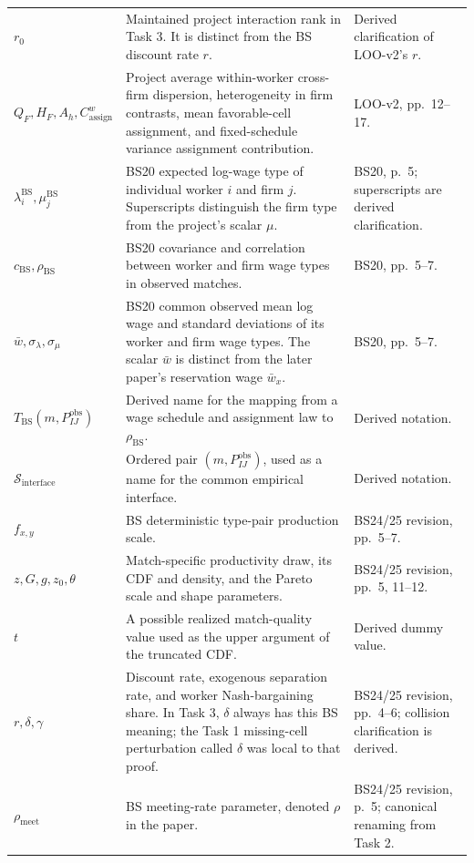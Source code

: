 \documentclass[11pt]{article}
\begin{document}
\begin{longtable}{p{}p{}p{}}
\(r_0\) & Maintained project interaction rank in Task 3.  It is distinct from
the BS discount rate \(r\). & Derived clarification of LOO-v2's \(r\). \\
\(Q_F,H_F,A_h,C^w_{\mathrm{assign}}\) & Project average within-worker
cross-firm dispersion, heterogeneity in firm contrasts, mean favorable-cell
assignment, and fixed-schedule variance assignment contribution. & LOO-v2,
pp.\ 12--17. \\
\(\lambda_i^{\mathrm{BS}},\mu_j^{\mathrm{BS}}\) & BS20 expected log-wage type
of individual worker \(i\) and firm \(j\).  Superscripts distinguish the firm
type from the project's scalar \(\mu\). & BS20, p.\ 5; superscripts are
derived clarification. \\
\(c_{\mathrm{BS}},\rho_{\mathrm{BS}}\) & BS20 covariance and correlation
between worker and firm wage types in observed matches. & BS20, pp.\ 5--7. \\
\(\bar w,\sigma_\lambda,\sigma_\mu\) & BS20 common observed mean log wage and
standard deviations of its worker and firm wage types.  The scalar
\(\bar w\) is distinct from the later paper's reservation wage
\(\bar w_x\). & BS20, pp.\ 5--7. \\
\(T_{\mathrm{BS}}(m,P^{\mathrm{obs}}_{IJ})\) & Derived name for the mapping
from a wage schedule and assignment law to \(\rho_{\mathrm{BS}}\). & Derived
notation. \\
\(\mathcal S_{\mathrm{interface}}\) & Ordered pair
\((m,P^{\mathrm{obs}}_{IJ})\), used as a name for the common empirical
interface. & Derived notation. \\
\(f_{x,y}\) & BS deterministic type-pair production scale. & BS24/25
revision, pp.\ 5--7. \\
\(z,G,g,z_0,\theta\) & Match-specific productivity draw, its CDF and density,
and the Pareto scale and shape parameters. & BS24/25 revision, pp.\ 5,
11--12. \\
\(t\) & A possible realized match-quality value used as the upper argument
of the truncated CDF. & Derived dummy value. \\
\(r,\delta,\gamma\) & Discount rate, exogenous separation rate, and worker
Nash-bargaining share.  In Task 3, \(\delta\) always has this BS meaning; the
Task 1 missing-cell perturbation called \(\delta\) was local to that proof. &
BS24/25 revision, pp.\ 4--6; collision clarification is derived. \\
\(\rho_{\mathrm{meet}}\) & BS meeting-rate parameter, denoted \(\rho\) in
the paper. & BS24/25 revision, p.\ 5; canonical renaming from Task 2. \\

\end{longtable}
\end{document}
